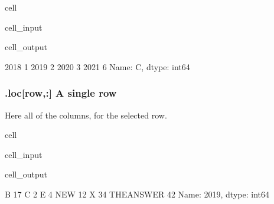\documentclass[letterpaper,10pt,english]{jupyterBook}
\begin{document}
\begin{sphinxuseclass}{cell}\begin{sphinxVerbatimInput}

\begin{sphinxuseclass}{cell_input}
\begin{sphinxVerbatim}[commandchars=\\\{\}]
\PYG{p}{[}\PYG{p}{]}
\end{sphinxVerbatim}

\end{sphinxuseclass}\end{sphinxVerbatimInput}
\begin{sphinxVerbatimOutput}

\begin{sphinxuseclass}{cell_output}
\begin{sphinxVerbatim}[commandchars=\\\{\}]
2018    1
2019    2
2020    3
2021    6
Name: C, dtype: int64
\end{sphinxVerbatim}

\end{sphinxuseclass}\end{sphinxVerbatimOutput}

\end{sphinxuseclass}

\subsubsection{.loc{[}row,:{]} A single row}
\label{\detokenize{content/04_PythonEssentials/PythonPandasDataframes:loc-row-a-single-row}}
\sphinxAtStartPar
Here all of the columns, for the selected row.

\begin{sphinxuseclass}{cell}\begin{sphinxVerbatimInput}

\begin{sphinxuseclass}{cell_input}
\begin{sphinxVerbatim}[commandchars=\\\{\}]
\PYG{p}{[}\PYG{p}{]}
\end{sphinxVerbatim}

\end{sphinxuseclass}\end{sphinxVerbatimInput}
\begin{sphinxVerbatimOutput}

\begin{sphinxuseclass}{cell_output}
\begin{sphinxVerbatim}[commandchars=\\\{\}]
B             17
C              2
E              4
NEW           12
X             34
THE\PYGZus{}ANSWER    42
Name: 2019, dtype: int64
\end{sphinxVerbatim}

\end{sphinxuseclass}\end{sphinxVerbatimOutput}

\end{sphinxuseclass}
\end{document}
